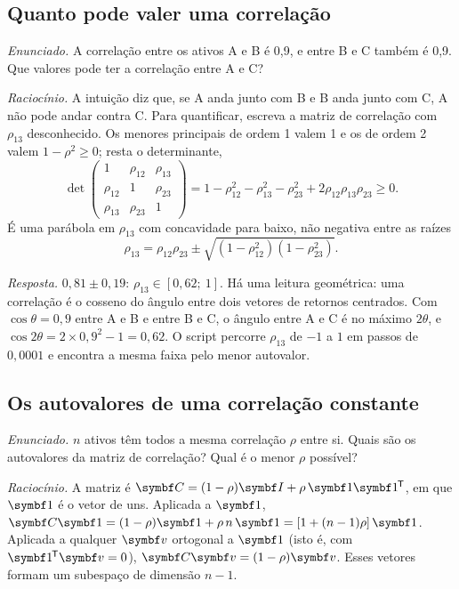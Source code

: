 \subsection{Quanto pode valer uma correlação}

\emph{Enunciado.} A correlação entre os ativos A e B é 0,9, e entre B e C também é 0,9. Que valores pode ter a correlação entre A e C?

\emph{Raciocínio.} A intuição diz que, se A anda junto com B e B anda junto com C, A não pode andar contra C. Para quantificar, escreva a matriz de correlação com $\rho_{13}$ desconhecido. Os menores principais de ordem 1 valem 1 e os de ordem 2 valem $1 - \rho^2 \ge 0$; resta o determinante,
\begin{equation*}
  \det \begin{pmatrix} 1 & \rho_{12} & \rho_{13} \\ \rho_{12} & 1 & \rho_{23} \\ \rho_{13} & \rho_{23} & 1 \end{pmatrix}
  = 1 - \rho_{12}^2 - \rho_{13}^2 - \rho_{23}^2 + 2\rho_{12}\rho_{13}\rho_{23} \ge 0 .
\end{equation*}
É uma parábola em $\rho_{13}$ com concavidade para baixo, não negativa entre as raízes
\begin{equation*}
  \rho_{13} = \rho_{12}\rho_{23} \pm \sqrt{(1 - \rho_{12}^2)(1 - \rho_{23}^2)} .
\end{equation*}

\emph{Resposta.} $0,81 \pm 0,19$: $\rho_{13} \in [0,62;\ 1]$. Há uma leitura geométrica: uma correlação é o cosseno do ângulo entre dois vetores de retornos centrados. Com $\cos\theta = 0,9$ entre A e B e entre B e C, o ângulo entre A e C é no máximo $2\theta$, e $\cos 2\theta = 2 \times 0,9^2 - 1 = 0,62$. O script percorre $\rho_{13}$ de $-1$ a $1$ em passos de $0,0001$ e encontra a mesma faixa pelo menor autovalor.

\subsection{Os autovalores de uma correlação constante}

\emph{Enunciado.} $n$ ativos têm todos a mesma correlação $\rho$ entre si. Quais são os autovalores da matriz de correlação? Qual é o menor $\rho$ possível?

\emph{Raciocínio.} A matriz é $\vetor{C} = (1-\rho)\vetor{I} + \rho\,\vetor{1}\vetor{1}\T$, em que $\vetor{1}$ é o vetor de uns. Aplicada a $\vetor{1}$, $\vetor{C}\vetor{1} = (1-\rho)\vetor{1} + \rho\, n\, \vetor{1} = [1 + (n-1)\rho]\,\vetor{1}$. Aplicada a qualquer $\vetor{v}$ ortogonal a $\vetor{1}$ (isto é, com $\vetor{1}\T\vetor{v} = 0$), $\vetor{C}\vetor{v} = (1-\rho)\vetor{v}$. Esses vetores formam um subespaço de dimensão $n-1$.

